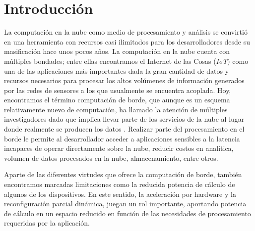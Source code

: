 
\chapter{Introducción} %
\label{Chapter1}

La computación en la nube como medio de procesamiento y análisis se convirtió en una herramienta con recursos casi ilimitados para los desarrolladores desde su masificación hace unos pocos años. La computación en la nube cuenta con múltiples bondades; entre ellas encontramos el Internet de las Cosas (\textit{IoT}) como una de las aplicaciones más importantes dada la gran cantidad de datos y recursos necesarios para procesar los altos volúmenes de información generados por las redes de sensores a los que usualmente se encuentra acoplada. Hoy, encontramos el término computación de borde, que aunque es un esquema relativamente nuevo de computación, ha llamado la atención de múltiples investigadores dado que implica llevar parte de los servicios de la nube al lugar donde realmente se producen los datos \cite{bonomi2014fog}. Realizar parte del procesamiento en el borde le permite al desarrollador acceder a aplicaciones sensibles a la latencia incapaces de operar directamente sobre la nube, reducir costos en analítica, volumen de datos procesados en la nube, almacenamiento, entre otros. 


Aparte de las diferentes virtudes que ofrece la computación de borde, también encontramos marcadas limitaciones como la reducida potencia de cálculo de algunos de los dispositivos. En este sentido, la aceleración por hardware y la reconfiguración parcial dinámica, juegan un rol importante, aportando potencia de cálculo en un espacio reducido en función de las necesidades de procesamiento requeridas por la aplicación.

